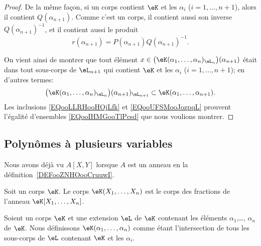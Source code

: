 \begin{proof}
        De la même façon, si un corps contient \( \eK\) et les \( \alpha_i\)  (\( i=1,\ldots, n+1\)), alors il contient \( Q(\alpha_{n+1})\). Comme c'est un corps, il contient aussi son inverse \( Q(\alpha_{n+1})^{-1}\), et il contient aussi le produit
            \begin{equation}
                r(\alpha_{n+1})=P(\alpha_{n+1})Q(\alpha_{n+1})^{-1}.
            \end{equation}

On vient ainsi de montrer que tout élément \( x \in  \big( \eK(\alpha_1,\ldots, \alpha_n)_{\eL_n} \big)(\alpha_{n+1})\) était dans tout sous-corps de \( \eL_{n+1} \) qui contient \( \eK \) et les \( \alpha_i\)  (\( i=1,\ldots, n+1\)); en d'autres termes:
    \begin{equation}\label{EQooUFSMooJozpqL}
       \big( \eK(\alpha_1,\ldots, \alpha_n)_{\eL_n} \big)(\alpha_{n+1})_{\eL_{n+1}} \subset \eK(\alpha_1,\ldots,\alpha_{n+1}).
    \end{equation}
    Les inclusions \eqref{EQooLLRHooHOjLfk} et \eqref{EQooUFSMooJozpqL} prouvent l'égalité d'ensembles \eqref{EQooIHMGooTlPcsd} que nous voulions montrer.
\end{proof}

\subsection{Polynômes à plusieurs variables}

Nous avons déjà vu \( A[X,Y]\) lorsque \( A\) est un anneau en la définition~\ref{DEFooZNHOooCruuwI}.

\begin{definition}      \label{DEFooRHRKooPqLNOp}
    Soit un corps \( \eK\). Le corps \( \eK(X_1,\ldots, X_n)\) est le corps des fractions de l'anneau \( \eK[X_1,\ldots, X_n]\).
\end{definition}

\begin{definition}  \label{DEFooOCPHooXneutp}
    Soient un corps \( \eK\) et une extension \( \eL\) de \( \eK\) contenant les éléments \( \alpha_1\),\ldots, \( \alpha_n\) de \( \eK\). Nous définissons \( \eK(\alpha_1,\ldots, \alpha_n)\) comme étant l'intersection de tous les sous-corps de \( \eL\) contenant \( \eK\) et les \( \alpha_i\).
\end{definition}

